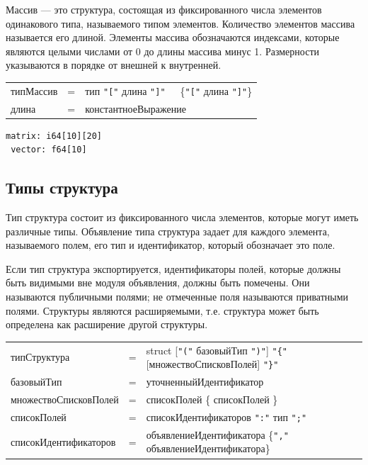 \documentclass[a4paper,12pt]{article}
\newcommand{\lit}[1]{\texttt{"#1"}}
\begin{document}
    Массив — это структура, состоящая из фиксированного числа элементов одинакового типа, называемого типом элементов. Количество элементов массива называется его длиной. Элементы массива обозначаются индексами, которые являются целыми числами от 0 до длины массива минус 1. Размерности указываются в порядке от внешней к внутренней.


    \begin{center}
        \vspace{0.5cm}
        \begin{tabular}{l c l}
            типМассив & = & тип \lit{[} длина \lit{]}\ \ \  \{\lit{[} длина \lit{]}\} \\
            длина & = & константноеВыражение
        \end{tabular}
    \end{center}


    \begin{center}
        \begin{minipage}[t]{0.5\textwidth}
            \begin{lstlisting}[style=obouldstyle]
 matrix: i64[10][20]
 vector: f64[10]
            \end{lstlisting}
        \end{minipage}
    \end{center}

    \subsection*{Типы структура}

    Тип структура состоит из фиксированного числа элементов, которые могут иметь различные типы. Объявление типа структура задает для каждого элемента, называемого полем, его тип и идентификатор, который обозначает это поле.

    Если тип структура экспортируется, идентификаторы полей, которые должны быть видимыми вне модуля объявления, должны быть помечены. Они называются публичными полями; не отмеченные поля называются приватными полями. Структуры являются расширяемыми, т.е. структура может быть определена как расширение другой структуры.

    \begin{center}
        \begin{tabular}{l c l}
            типСтруктура & = & struct [\lit{(} базовыйТип \lit{)}] \lit{\{} [множествоСписковПолей] \lit{\}} \\
            базовыйТип & = & уточненныйИдентификатор \\
            множествоСписковПолей & = & списокПолей \{ списокПолей \} \\
            списокПолей & = & списокИдентификаторов \lit{:} тип \lit{;} \\
            списокИдентификаторов & = & объявлениеИдентификатора \{\lit{,} объявлениеИдентификатора\} \\
        \end{tabular}
    \end{center}
\end{document}
